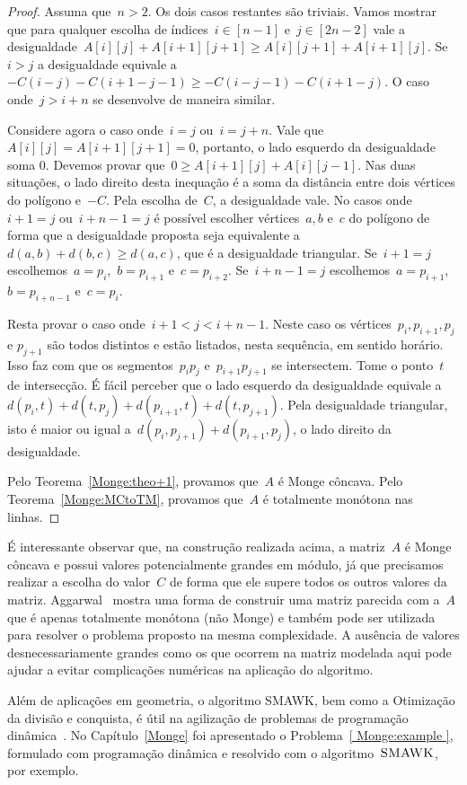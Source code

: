 \begin{proof}
Assuma que~$n > 2$. Os dois casos restantes são triviais. Vamos mostrar que para qualquer escolha de índices~${ i \in [n-1] }$ e~${ j \in [2n-2] }$ vale a desigualdade~${ A[i][j] + A[i+1][j+1] \geq A[i][j+1] + A[i+1][j] }$. Se~$i > j$ a desigualdade equivale a~${ -C(i - j) - C(i + 1 - j - 1) \geq -C(i - j - 1) - C(i + 1 - j) }$. O caso onde~${ j > i + n} $ se desenvolve de maneira similar.

Considere agora o caso onde~$i = j$ ou~$i = j + n$. Vale que~$A[i][j] = A[i+1][j+1] = 0$, portanto, o lado esquerdo da desigualdade soma 0. Devemos provar que~$0 \geq A[i+1][j] + A[i][j-1]$. Nas duas situações, o lado direito desta inequação é a soma da distância entre dois vértices do polígono e~$-C$. Pela escolha de~$C$, a desigualdade vale. No casos onde~$i + 1 = j$ ou~$i + n - 1 = j$ é possível escolher vértices~$a,b$ e~$c$ do polígono de forma que a desigualdade proposta seja equivalente a~$d(a,b) + d(b,c) \geq d(a,c)$, que é a desigualdade triangular. Se~$i+1 = j$ escolhemos~$a = p_i$,~$b = p_{i+1}$ e~$c = p_{i+2}$. Se~$i+n-1 = j$ escolhemos~$a = p_{i+1}$,~$b = p_{i+n-1}$ e~$c = p_{i}$.

Resta provar o caso onde~$i + 1 < j < i + n - 1$. Neste caso os vértices~$p_i,p_{i+1},p_j$ e $p_{j+1}$ são todos distintos e estão listados, nesta sequência, em sentido horário. Isso faz com que os segmentos~$p_ip_j$ e~$p_{i+1}p_{j+1}$ se intersectem. Tome o ponto~$t$ de intersecção. É fácil perceber que o lado esquerdo da desigualdade equivale a~$d(p_i,t) + d(t,p_j) + d(p_{i+1},t) + d(t,p_{j+1})$. Pela desigualdade triangular, isto é maior ou igual a~$d(p_i,p_{j+1}) + d(p_{i+1},p_j)$, o lado direito da desigualdade.

Pelo Teorema~\ref{Monge:theo+1}, provamos que~$A$ é Monge côncava. Pelo Teorema~\ref{Monge:MCtoTM}, provamos que~$A$ é totalmente monótona nas linhas.
\end{proof}

É interessante observar que, na construção realizada acima, a matriz~$A$ é Monge côncava e possui valores potencialmente grandes em módulo, já que precisamos realizar a escolha do valor~$C$ de forma que ele supere todos os outros valores da matriz. Aggarwal~\cite{Aggarwal:1987} mostra uma forma de construir uma matriz parecida com a~$A$ que é apenas totalmente monótona (não Monge) e também pode ser utilizada para resolver o problema proposto na mesma complexidade. A ausência de valores desnecessariamente grandes como os que ocorrem na matriz modelada aqui pode ajudar a evitar complicações numéricas na aplicação do algoritmo.

Além de aplicações em geometria, o algoritmo SMAWK, bem como a Otimização da divisão e conquista, é útil na agilização de problemas de programação dinâmica~\cite{Galil:1989,Galil:1992}. No Capítulo~\ref{Monge} foi apresentado o Problema~\ref{ Monge:example }, formulado com programação dinâmica e resolvido com o algoritmo~$\textsc{SMAWK}$, por exemplo.
